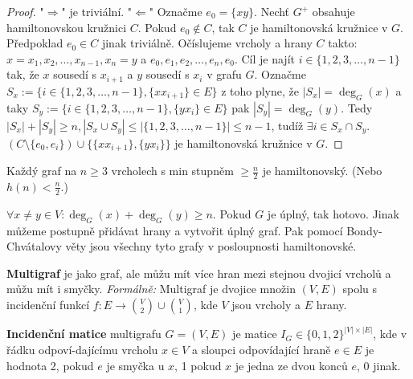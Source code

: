 \begin{proof}
	"$\Rightarrow$" je triviální. "$\Leftarrow$" Označme $e_{0} = \{xy\}$. Nechť $G^{+}$ obsahuje hamiltonovskou kružnici $C$. Pokud $e_{0} \notin C$, tak $C$ je hamiltonovská kružnice v $G$. Předpoklad $e_{0} \in C$ jinak triviálně. Očíslujeme vrcholy a hrany $C$ takto: $x = x_{1}, x_{2}, \dots, x_{n-1}, x_{n} = y$ a $e_{0}, e_{1}, e_{2}, \dots , e_{n}, e_{0}$. Cíl je najít $i \in \{1,2,3, \dots, n-1\}$ tak, že $x$ sousedí s $x_{i+1}$ a $y$ sousedí s $x_{i}$ v grafu $G$. Označme $S_{x} := \{i \in \{1,2,3,\dots,n-1\}, \{xx_{i+1}\} \in E\}$ z toho plyne, že $|S_{x}| = \deg_{G}(x)$ a taky $S_{y} := \{i \in \{1,2,3,\dots,n-1\}, \{yx_{i}\} \in E\}$ pak $|S_{y}| = \deg_{G}(y)$. Tedy $|S_{x}| + |S_{y}| \geq n, |S_{x} \cup S_{y}| \leq |\{1,2,3, \dots, n-1\}| \leq n-1$, tudíž $\exists i \in S_{x} \cap S_{y}$. $(C \setminus \{e_{0},e_{i}\}) \cup \{\{xx_{i+1}\},\{yx_{i}\}\}$ je hamiltonovská kružnice v $G$.
\end{proof}

\begin{dusl}[Dirac]
	Každý graf na $n \geq 3$ vrcholech s min stupněm $\geq \frac{n}{2}$ je hamiltonovský. (Nebo $h(n) < \frac{n}{2}$.)
\end{dusl}

\begin{dusl}
	$\forall x \neq y \in V: \deg_{G}(x) + \deg_{G}(y) \geq n$. Pokud $G$ je úplný, tak hotovo. Jinak můžeme postupně přidávat hrany a vytvořit úplný graf. Pak pomocí Bondy-Chvátalovy věty jsou všechny tyto grafy v posloupnosti hamiltonovské.
\end{dusl}

\begin{definice}
	\textbf{Multigraf} je jako graf, ale můžu mít více hran mezi stejnou dvojicí vrcholů a můžu mít i smyčky. \textit{Formálně:} Multigraf je dvojice množin $(V,E)$ spolu s incidenční funkcí $f: E \to \binom{V}{2} \cup \binom{V}{1}$, kde $V$ jsou vrcholy a $E$ hrany.
\end{definice}

\begin{definice}
	\textbf{Incidenční matice} multigrafu $G = (V,E)$ je matice $I_{G} \in \{0,1,2\}^{|V| \times |E|}$, kde v řádku odpoví-\newline dajícímu vrcholu $x \in V$ a sloupci odpovídající hraně $e \in E$ je hodnota 2, pokud $e$ je smyčka u $x$, 1 pokud $x$ je jedna ze dvou konců $e$, 0 jinak.
\end{definice}

